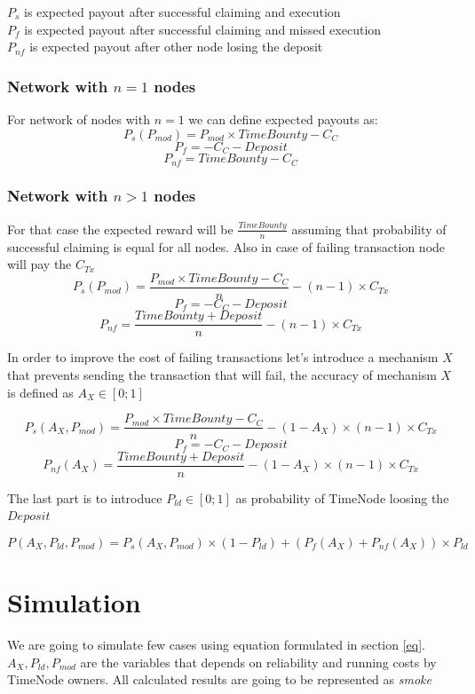 \documentclass{article}
\begin{document}
  $P_{s}$ is expected payout after successful claiming and execution
  \\
  
  $P_{f}$ is expected payout after successful claiming and missed execution
  \\
  
  $P_{nf}$ is expected payout after other node losing the deposit
  \\
  
  \subsubsection{Network with $n=1$ nodes}
  For network of nodes with $n=1$ we can define expected payouts as:
  \[
  P_{s}(P_{mod})=P_{mod} \times TimeBounty-C_{C} 
  \]
  \[
  P_{f}=-C_{C}-Deposit
  \]
  \[
  P_{nf}=TimeBounty-C_{C}
  \]
  \subsubsection{Network with $n>1$ nodes}
  For that case the expected reward will be $\frac{TimeBounty}{n}$ assuming that probability of successful claiming is equal for all nodes. Also in case of failing transaction node will pay the $C_{Tx}$
  \[
  P_{s}(P_{mod})=\frac{P_{mod} \times TimeBounty-C_{C}}{n} - (n-1) \times C_{Tx}
  \]
  \[
  P_{f}=-C_{C}-Deposit
  \]
  \[
  P_{nf}=\frac{TimeBounty+Deposit}{n} - (n-1) \times C_{Tx}
  \]
  
  In order to improve the cost of failing transactions let's introduce a mechanism $X$ that prevents sending the transaction that will fail, the accuracy of mechanism $X$ is defined as $A_{X} \in [0;1]$
  
  \[
  P_{s}(A_{X}, P_{mod})=\frac{P_{mod} \times TimeBounty-C_{C}}{n} - (1-A_{X}) \times (n-1) \times C_{Tx}
  \]
  \[
  P_{f}=-C_{C}-Deposit
  \]
  \[
  P_{nf}(A_{X})=\frac{TimeBounty+Deposit}{n} - (1-A_{X}) \times (n-1) \times C_{Tx}
  \]
  
  The last part is to introduce $P_{ld} \in [0;1]$ as probability of TimeNode loosing the $Deposit$
  
  
  \[
  \label{eq}
  P(A_{X}, P_{ld}, P_{mod})=P_{s}(A_{X}, P_{mod}) \times (1-P_{ld}) + (P_{f}(A_{X})+P_{nf}(A_{X})) \times P_{ld}
  \]
  \section{Simulation}
  We are going to simulate few cases using equation formulated in section \ref{eq}. $A_{X}, P_{ld}, P_{mod}$ are the variables that depends on reliability and running costs by TimeNode owners. All calculated results are going to be represented as \textit{smoke}
  
\end{document}
